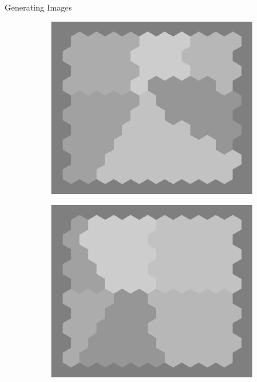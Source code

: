 \documentclass[10pt,xcolor=svgnames]{beamer} %
\begin{document}
\begin{frame}[standout]{Generating Images}
    \begin{figure}
        \centering
        \begin{subfigure}{0.4\textwidth}
        \centering
            \includegraphics[width=\textwidth]{pictures/grid_init1.png}   
        \end{subfigure}
        \hfill
        \begin{subfigure}{0.4\textwidth}
        \centering
            \includegraphics[width=\textwidth]{pictures/grid_init2.png}

\end{subfigure}
\end{figure}
\end{frame}
\end{document}
